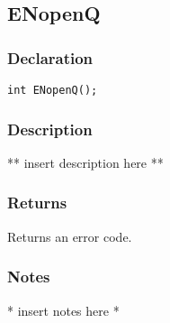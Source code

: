 \subsection{ENopenQ}
\subsubsection{Declaration}
\begin{lstlisting}
int ENopenQ();
\end{lstlisting}
\subsubsection{Description}
** insert description here **
\subsubsection{Returns}
Returns an error code.
\subsubsection{Notes}
* insert notes here *